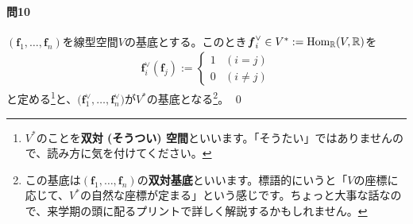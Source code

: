 \paragraph{問10} $(\bm{f}_1, \ldots, \bm{f}_n)$を線型空間$V$の基底とする。このとき$\boldsymbol{f}^{\vee}_i\in V^* := \operatorname{Hom}_{\mathbb{R}}(V, \mathbb{R})$を
\begin{align*}
\bm{f}^{\vee}_i(\bm{f}_j) :=
\begin{cases}
1 & (i = j) \\
0 & (i \neq j)
\end{cases}
\end{align*}
と定める\footnote{$V^*$のことを\textbf{双対 (そうつい) 空間}といいます。「そうたい」ではありませんので、読み方に気を付けてください。}と、$\bigl(\bm{f}^{\vee}_1, \ldots, \bm{f}^{\vee}_n\bigr)$が$V^*$の基底となる\footnote{この基底は$(\bm{f}_1, \ldots, \bm{f}_n)$の\textbf{双対基底}といいます。標語的にいうと「$V$の座標に応じて、$V^*$の自然な座標が定まる」という感じです。ちょっと大事な話なので、来学期の頭に配るプリントで詳しく解説するかもしれません。}。 \qed

